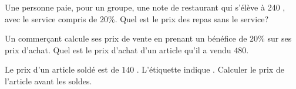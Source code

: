 \documentclass[11pt,a4paper]{article}  %
\begin{document}

\begin{enumMet}
	\item Une personne paie, pour un groupe, une note de restaurant qui s'élève à 240 \EUR{}, avec le service compris de $20 \%$. Quel est le prix des repas sans le service?
	\item Un commerçant calcule ses prix de vente en prenant un bénéfice de $20 \%$ sur ses prix d'achat. Quel est le prix d'achat d'un article qu'il a vendu $480$\EUR{}.
	\item Le prix d'un article soldé est de $140$ \EUR{}. L'étiquette indique . Calculer le prix de l'article avant les soldes.
\end{enumMet}
\end{document}

